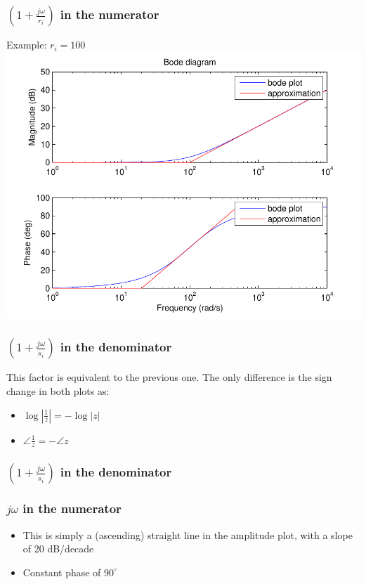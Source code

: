 \begin{frame}
\frametitle{$(1+\frac{j\omega}{r_i})$ in the numerator}
Example: $r_i = 100$
\includegraphics[scale=0.5]{BodeNumerator}

\end{frame}



\begin{frame}
\frametitle{$(1+\frac{j\omega}{s_i})$ in the denominator}
This factor is equivalent to the previous one. The only difference is the sign change in both plots as:
\begin{itemize}
\item $\log |\frac{1}{z}| = -\log|z|$
\item $\angle \frac{1}{z} = -\angle z$
\end{itemize}


\end{frame}


\begin{frame}
\frametitle{$(1+\frac{j\omega}{s_i})$ in the denominator}



\end{frame}


\begin{frame}
\frametitle{$j\omega$ in the numerator}
\begin{itemize}
\item This is simply a (ascending) straight line in the amplitude plot, with a slope of 20 dB/decade
\item Constant phase of $90^{\circ}$
\end{itemize}


\end{frame}



